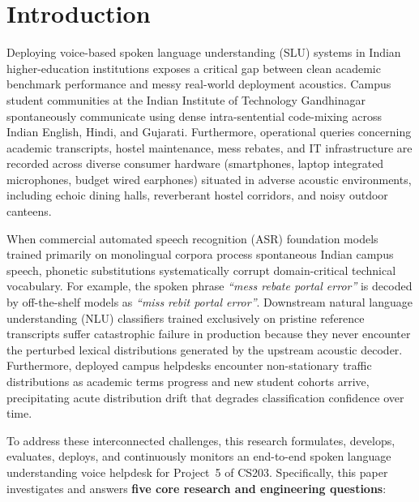 \documentclass[sigconf,authordraft]{acmart}
\begin{document}
\maketitle

\section{Introduction}
\label{sec:intro}

Deploying voice-based spoken language understanding (SLU) systems in Indian higher-education
institutions exposes a critical gap between clean academic benchmark performance and messy
real-world deployment acoustics. Campus student communities at the Indian Institute of Technology
Gandhinagar spontaneously communicate using dense intra-sentential code-mixing across Indian English,
Hindi, and Gujarati. Furthermore, operational queries concerning academic transcripts, hostel maintenance,
mess rebates, and IT infrastructure are recorded across diverse consumer hardware (smartphones,
laptop integrated microphones, budget wired earphones) situated in adverse acoustic environments,
including echoic dining halls, reverberant hostel corridors, and noisy outdoor canteens.

When commercial automated speech recognition (ASR) foundation models trained primarily on monolingual
corpora process spontaneous Indian campus speech, phonetic substitutions systematically corrupt
domain-critical technical vocabulary. For example, the spoken phrase \emph{``mess rebate portal error''}
is decoded by off-the-shelf models as \emph{``miss rebit portal error''}. Downstream natural language
understanding (NLU) classifiers trained exclusively on pristine reference transcripts suffer catastrophic
failure in production because they never encounter the perturbed lexical distributions generated by the
upstream acoustic decoder. Furthermore, deployed campus helpdesks encounter non-stationary traffic
distributions as academic terms progress and new student cohorts arrive, precipitating acute distribution
drift that degrades classification confidence over time.

To address these interconnected challenges, this research formulates, develops, evaluates, deploys,
and continuously monitors an end-to-end spoken language understanding voice helpdesk for Project~5
of CS203. Specifically, this paper investigates and answers \textbf{five core research and engineering questions}:
\end{document}

